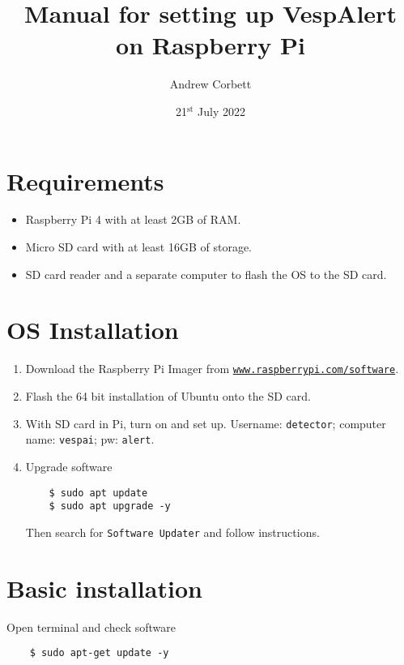 \documentclass[12pt, a4paper, oneside]{article}
\title{Manual for setting up VespAlert on Raspberry Pi}
\author{Andrew Corbett}
\date{21$^{\mathrm{st}}$ July 2022}
\begin{document}
\maketitle

\section{Requirements}

\begin{itemize}
\item
Raspberry Pi 4 with at least 2GB of RAM.

\item
Micro SD card with at least 16GB of storage.

\item
SD card reader and a separate computer to flash the OS to the SD card.
\end{itemize}


\section{OS Installation}

\begin{enumerate}

\item
Download the Raspberry Pi Imager from \href{https://www.raspberrypi.com/software/}{\texttt{www.raspberrypi.com/software}}.

\item
Flash the 64 bit installation of Ubuntu onto the SD card.

\item
With SD card in Pi, turn on and set up. Username: \texttt{detector}; computer name: \texttt{vespai}; pw: \texttt{alert}.

\item
Upgrade software
\begin{verbatim}
	$ sudo apt update
	$ sudo apt upgrade -y
\end{verbatim}
Then search for \texttt{Software Updater} and follow instructions.

\end{enumerate}


\section{Basic installation}
Open terminal and check software
\begin{verbatim}
	$ sudo apt-get update -y
\end{verbatim}
\end{document}
